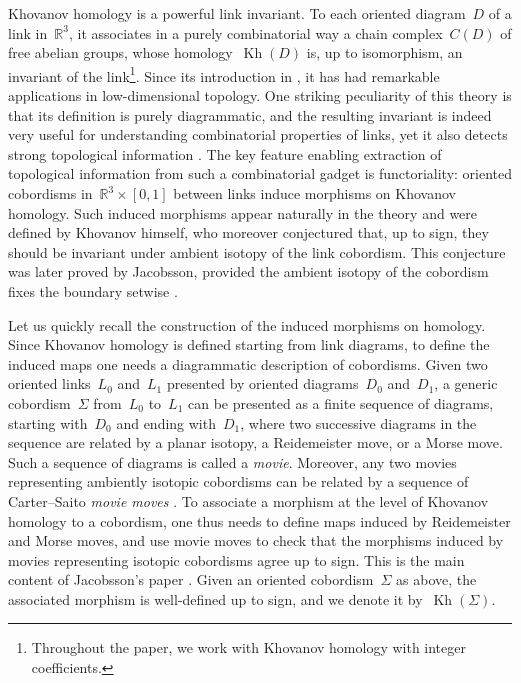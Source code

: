 \documentclass{amsart}
\theoremstyle{definition}
\theoremstyle{definition}
\theoremstyle{definition}
\theoremstyle{definition}
\newcommand{\R}{\mathbb{R}}
\DeclareMathOperator{\Kh}{Kh}
\begin{document}
Khovanov homology is a powerful link invariant. To each oriented diagram~$D$ of a link in~$\R^3$, it associates in a purely combinatorial way a chain complex~$C(D)$ of free abelian groups, whose homology~$\Kh(D)$ is, up to isomorphism, an invariant of the link\footnote{Throughout the paper, we work with Khovanov homology with integer coefficients.}. Since its introduction in \cite{Khovanov_OG}, it has had remarkable applications in low-dimensional topology. One striking peculiarity of this theory is that its definition is purely diagrammatic, and the resulting invariant is indeed very useful for understanding combinatorial properties of links, yet it also detects strong topological information \cite{Rasmussen, Piccirillo, Hayden_Sundberg, Ren-Willis}. The key feature enabling extraction of topological information from such a combinatorial gadget is functoriality: oriented cobordisms in~$\R^3\times [0,1]$ between links induce morphisms on Khovanov homology. Such induced morphisms appear naturally in the theory and were defined by Khovanov himself, who moreover conjectured that, up to sign, they should be invariant under ambient isotopy of the link cobordism. This conjecture was later proved by Jacobsson, provided the ambient isotopy of the cobordism fixes the boundary setwise \cite{Jacobsson}.

Let us quickly recall the construction of the induced morphisms on homology. Since Khovanov homology is defined starting from link diagrams, to define the induced maps one needs a diagrammatic description of cobordisms. Given two oriented links~$L_0$ and~$L_1$ presented by oriented diagrams~$D_0$ and~$D_1$, a generic cobordism~$\Sigma$ from~$L_0$ to~$L_1$ can be presented as a finite sequence of diagrams, starting with~$D_0$ and ending with~$D_1$, where two successive diagrams in the sequence are related by a planar isotopy, a Reidemeister move, or a Morse move. Such a sequence of diagrams is called a \textit{movie}. Moreover, any two movies representing ambiently isotopic cobordisms can be related by a sequence of Carter--Saito \textit{movie moves} \cite{Carter-Saito-1}. To associate a morphism at the level of Khovanov homology to a cobordism, one thus needs to define maps induced by Reidemeister and Morse moves, and use movie moves to check that the morphisms induced by movies representing isotopic cobordisms agree up to sign. This is the main content of Jacobsson's paper \cite{Jacobsson}.
Given an oriented cobordism~$\Sigma$ as above, the associated morphism is well-defined up to sign, and we denote it by~$\Kh(\Sigma)$.
\end{document}
